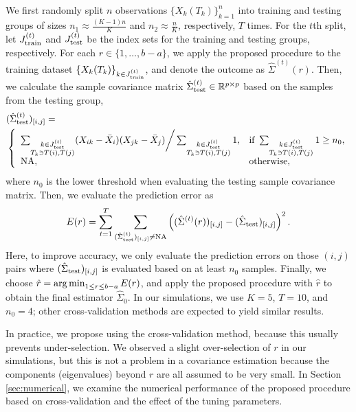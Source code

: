 \documentclass[11pt]{article}
\newcommand{\0}{{\mathbf{0}}}
\newcommand{\1}{{\mathbf{1}}}
\newcommand{\argmin}{\mathop{\rm arg\min}}
\begin{document}
We first randomly split $n$ observations $\{X_k(T_k)\}_{k=1}^n$ into training and testing groups of sizes $n_1 \approx \frac{(K-1)n}{K}$ and $n_2 \approx \frac{n}{K}$, respectively, $T$ times. For the $t$th split, let $J_{\rm train}^{(t)}$ and $J_{\rm test}^{(t)}$ be the index sets for the training and testing groups, respectively. For each $r \in \{1,\ldots,b-a\}$, we apply the proposed procedure to the training dataset $\{X_k(T_k)\}_{k\in J_{\rm train}^{(t)}}$, and denote the outcome as $\hat{\Sigma}^{(t)}(r)$. Then, we calculate the sample covariance matrix $\hat{\Sigma}_{\rm test}^{(t)}\in \mathbb{R}^{p\times p}$ based on the samples from the testing group,
\begin{equation*}
\begin{split}
& (\hat{\Sigma}_{\rm test}^{(t)})_{[i, j]} = \\
& \left\{\begin{array}{ll}
\sum_{\substack{k \in J_{\rm test}^{(t)}\\T_k\ni T(i), T(j)}} (X_{ik} - \bar{X}_i) (X_{jk}-\bar{X}_j)\bigg/  \sum_{\substack{k \in J_{\rm test}^{(t)}\\ T_k\ni T(i), T(j)}}  1, & \text{if } \sum_{\substack{k \in J_{\rm test}^{(t)}\\  T_k\ni T(i), T(j)}}  1 \geq n_0,\\
{\rm NA}, &  {\rm otherwise},
\end{array}
\right. 
\end{split}
\end{equation*}
where $n_0$ is the lower threshold when evaluating the testing sample covariance matrix. Then, we evaluate the prediction error as
$$E(r) = \sum_{t=1}^T \sum_{(\hat{\Sigma}_{\rm test}^{(t)})_{[i, j]} \neq {\rm NA}} \left((\hat{\Sigma}^{(t)}(r))_{[i, j]} - (\hat{\Sigma}_{\rm test})_{[i, j]}\right)^2.$$
Here, to improve accuracy, we only evaluate the prediction errors on those $(i, j)$ pairs where $(\hat{\Sigma}_{\rm test})_{[i, j]}$ is evaluated based on at least $n_0$ samples. Finally, we choose $\hat{r}  = \argmin_{1\leq r \leq b-a} E(r)$, and apply the proposed procedure with $\hat{r}$ to obtain the final estimator $\hat{\Sigma}_0$. In our simulations, we use $K= 5$, $T= 10$, and $n_0 = 4$; other cross-validation methods are expected to yield similar results.

In practice, we propose using the cross-validation method, because this usually prevents under-selection. We observed a slight over-selection of $r$ in our simulations, but this is not a problem in a covariance estimation because the components (eigenvalues) beyond $r$ are all assumed to be very small. In Section \ref{sec:numerical}, we examine the numerical performance of the proposed procedure based on cross-validation and the effect of the tuning parameters.
\end{document}
